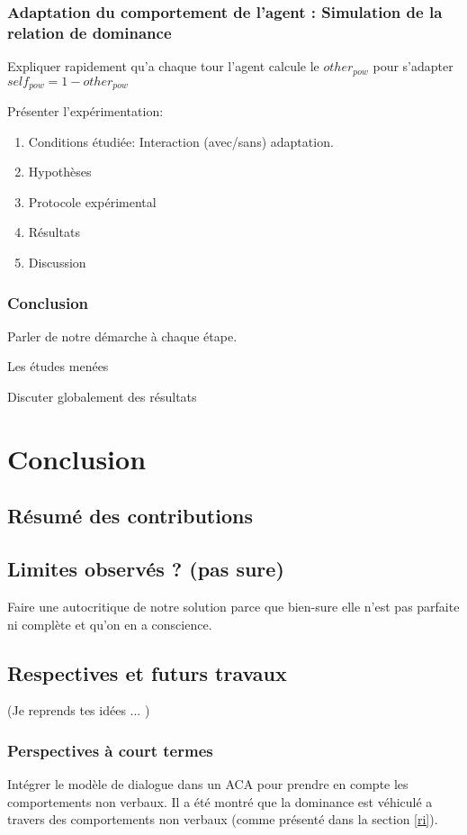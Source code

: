 \documentclass [french]{article}
\begin{document}
	\subsubsection{Adaptation du comportement de l'agent : Simulation de la relation de dominance}		
		Expliquer rapidement qu'a chaque tour l'agent calcule le $other_{pow}$ pour s'adapter $ self_{pow}= 1 - other_{pow}$
		
		Présenter l'expérimentation:
		
		\begin{enumerate}
			\item Conditions étudiée: Interaction (avec/sans) adaptation.
			\item Hypothèses
			\item Protocole expérimental
			\item Résultats
			\item Discussion
		\end{enumerate}
		
	\subsubsection{Conclusion}
		Parler de notre démarche à chaque étape.
		
		Les études menées
		
		Discuter globalement des résultats
	
	\section{Conclusion}
		\subsection{Résumé des contributions}
		
		\subsection{Limites observés ? (pas sure)}
			Faire une autocritique de notre solution parce que bien-sure elle n'est pas parfaite ni complète et qu'on en a conscience. 
		
		\subsection{Respectives et futurs travaux}
			(Je reprends tes idées ... )
			\subsubsection{Perspectives à court termes}
				Intégrer le modèle de dialogue dans un ACA pour prendre en compte les comportements non verbaux. Il a été montré que la dominance est véhiculé a travers des comportements non verbaux (comme présenté dans la section \ref{ri}).
			
\end{document}
